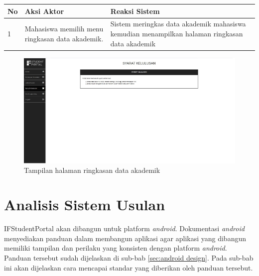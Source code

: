 \begin{enumerate}
\begin{itemize}
			\begin{tabular}{|p{0.5cm} |p{6cm}| p{6cm}|}
						\hline
							No 	& Aksi Aktor & Reaksi Sistem \\ \hline
							1 	& Mahasiswa memilih menu ringkasan data akademik. 	&	Sistem meringkas data akademik mahasiswa kemudian menampilkan halaman ringkasan data akademik \\ \hline 
						\end{tabular} 
		\end{itemize}
		\begin{figure}[H]
				\centering
				\includegraphics[scale=0.3]{Gambar/ringkasan}
				\caption{Tampilan halaman ringkasan data akademik} 
				\label{fig:ifstudpor_ringkasan}
			\end{figure}
\end{enumerate}


\section{Analisis Sistem Usulan}
IFStudentPortal akan dibangun untuk platform \textit{android}. Dokumentasi \textit{android} menyediakan panduan dalam membangun aplikasi agar aplikasi yang dibangun memiliki tampilan dan perilaku yang konsisten dengan platform \textit{android}. Panduan tersebut sudah dijelaskan di sub-bab \ref{sec:android design}. Pada sub-bab ini akan dijelaskan cara mencapai standar yang diberikan oleh panduan tersebut.

